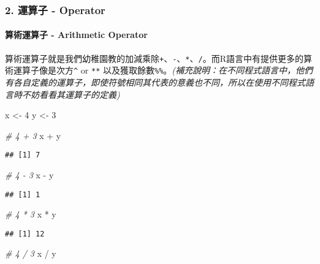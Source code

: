 \documentclass[]{article}
\newenvironment{Shaded}{\begin{snugshade}}{\end{snugshade}}
\newcommand{\DecValTok}[1]{\textcolor[rgb]{0.00,0.00,0.81}{{#1}}}
\newcommand{\StringTok}[1]{\textcolor[rgb]{0.31,0.60,0.02}{{#1}}}
\newcommand{\CommentTok}[1]{\textcolor[rgb]{0.56,0.35,0.01}{\textit{{#1}}}}
\newcommand{\NormalTok}[1]{{#1}}
\let\oldparagraph\paragraph
\renewcommand{\paragraph}[1]{\oldparagraph{#1}\mbox{}}
\begin{document}
\subsubsection{2. 運算子 - Operator}\label{---operator}

\paragraph{算術運算子 - Arithmetic
Operator}\label{---arithmetic-operator}

算術運算子就是我們幼稚園教的加減乘除\texttt{+}、\texttt{-}、\texttt{*}、\texttt{/}。而R語言中有提供更多的算術運算子像是次方\texttt{\^{}}
or \texttt{**}
以及獲取餘數\texttt{\%\%}。\emph{(補充說明：在不同程式語言中，他們有各自定義的運算子，即使符號相同其代表的意義也不同，所以在使用不同程式語言時不妨看看其運算子的定義)}

\begin{Shaded}
\begin{Highlighting}[]
\NormalTok{x <-}\StringTok{ }\DecValTok{4}
\NormalTok{y <-}\StringTok{ }\DecValTok{3}

\CommentTok{# 4 + 3}
\NormalTok{x +}\StringTok{ }\NormalTok{y}
\end{Highlighting}
\end{Shaded}

\begin{verbatim}
## [1] 7
\end{verbatim}

\begin{Shaded}
\begin{Highlighting}[]
\CommentTok{# 4 - 3}
\NormalTok{x -}\StringTok{ }\NormalTok{y}
\end{Highlighting}
\end{Shaded}

\begin{verbatim}
## [1] 1
\end{verbatim}

\begin{Shaded}
\begin{Highlighting}[]
\CommentTok{# 4 * 3}
\NormalTok{x *}\StringTok{ }\NormalTok{y }
\end{Highlighting}
\end{Shaded}

\begin{verbatim}
## [1] 12
\end{verbatim}

\begin{Shaded}
\begin{Highlighting}[]
\CommentTok{# 4 / 3}
\NormalTok{x /}\StringTok{ }\NormalTok{y}
\end{Highlighting}
\end{Shaded}
\end{document}
